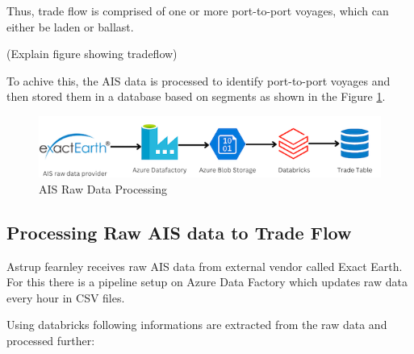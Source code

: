 Thus, trade flow is comprised of one or more port-to-port voyages, which can either be laden or ballast.

(Explain figure showing tradeflow)

To achive this, the AIS data is processed to identify port-to-port voyages and then stored them in a database based on segments as shown in the Figure \ref{ais_processing}.

\begin{figure}[h]
    \centering
    \includegraphics{images/ais_processing.png}
    \caption{AIS Raw Data Processing}
    \label{ais_processing}
\end{figure}

\subsection{Processing Raw AIS data to Trade Flow}

Astrup fearnley receives raw AIS data from external vendor called Exact Earth.
For this there is a pipeline setup on Azure Data Factory which updates raw data every hour in CSV files.

Using databricks following informations are extracted from the raw data and processed further:


